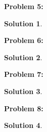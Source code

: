 \documentclass[12pt, letterpaper]{article}
\theoremstyle{nonumberplain}
\newtheorem{sol}{Solution}
\begin{document}
\hspace{18pt}\textbf{Problem 5:} \medskip
\begin{sol}
    
\end{sol}

\hspace{18pt}\textbf{Problem 6:} \medskip
\begin{sol}
    
\end{sol}

\hspace{18pt}\textbf{Problem 7:} \medskip
\begin{sol}
    
\end{sol}

\hspace{18pt}\textbf{Problem 8:} \medskip
\begin{sol}
    
\end{sol}
\end{document}
